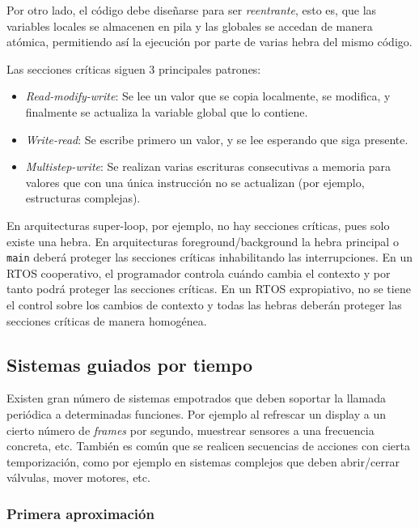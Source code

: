 \documentclass[../main.tex]{subfiles}
\begin{document}
        Por otro lado, el código debe diseñarse para ser \emph{reentrante}, esto es, que las variables locales se almacenen en pila y las globales se accedan de manera atómica, permitiendo así la ejecución por parte de varias hebra del mismo código.

        Las secciones críticas siguen 3 principales patrones:

        \begin{itemize}
            \item \emph{Read-modify-write}: Se lee un valor que se copia localmente, se modifica, y finalmente se actualiza la variable global que lo contiene.
            \item \emph{Write-read}: Se escribe primero un valor, y se lee esperando que siga presente.
            \item \emph{Multistep-write}: Se realizan varias escrituras consecutivas a memoria para valores que con una única instrucción no se actualizan (por ejemplo, estructuras complejas).
        \end{itemize}

        En arquitecturas super-loop, por ejemplo, no hay secciones críticas, pues solo existe una hebra. En arquitecturas foreground/background la hebra principal o \texttt{main} deberá proteger las secciones críticas inhabilitando las interrupciones. En un RTOS cooperativo, el programador controla cuándo cambia el contexto y por tanto podrá proteger las secciones críticas. En un RTOS expropiativo, no se tiene el control sobre los cambios de contexto y todas las hebras deberán proteger las secciones críticas de manera homogénea.


    \subsection{Sistemas guiados por tiempo}

        Existen gran número de sistemas empotrados que deben soportar la llamada periódica a determinadas funciones. Por ejemplo al refrescar un display a un cierto número de \emph{frames} por segundo, muestrear sensores a una frecuencia concreta, etc. También es común que se realicen secuencias de acciones con cierta temporización, como por ejemplo en sistemas complejos que deben abrir/cerrar válvulas, mover motores, etc.

        \subsubsection{Primera aproximación}
\end{document}
